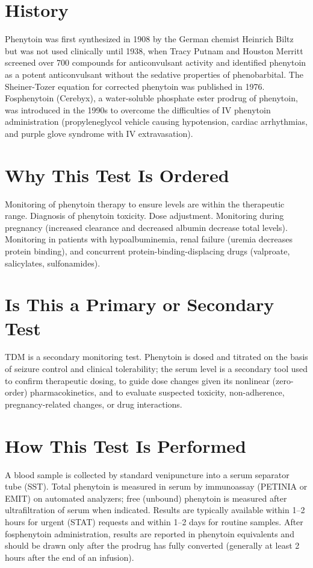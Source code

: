 \section*{History}
Phenytoin was first synthesized in 1908 by the German chemist Heinrich Biltz but was not used clinically until 1938, when Tracy Putnam and Houston Merritt screened over 700 compounds for anticonvulsant activity and identified phenytoin as a potent anticonvulsant without the sedative properties of phenobarbital. The Sheiner-Tozer equation for corrected phenytoin was published in 1976. Fosphenytoin (Cerebyx), a water-soluble phosphate ester prodrug of phenytoin, was introduced in the 1990s to overcome the difficulties of IV phenytoin administration (propyleneglycol vehicle causing hypotension, cardiac arrhythmias, and purple glove syndrome with IV extravasation).

\section*{Why This Test Is Ordered}
Monitoring of phenytoin therapy to ensure levels are within the therapeutic range. Diagnosis of phenytoin toxicity. Dose adjustment. Monitoring during pregnancy (increased clearance and decreased albumin decrease total levels). Monitoring in patients with hypoalbuminemia, renal failure (uremia decreases protein binding), and concurrent protein-binding-displacing drugs (valproate, salicylates, sulfonamides).

\section*{Is This a Primary or Secondary Test}
TDM is a secondary monitoring test. Phenytoin is dosed and titrated on the basis of seizure control and clinical tolerability; the serum level is a secondary tool used to confirm therapeutic dosing, to guide dose changes given its nonlinear (zero-order) pharmacokinetics, and to evaluate suspected toxicity, non-adherence, pregnancy-related changes, or drug interactions.

\section*{How This Test Is Performed}
A blood sample is collected by standard venipuncture into a serum separator tube (SST). Total phenytoin is measured in serum by immunoassay (PETINIA or EMIT) on automated analyzers; free (unbound) phenytoin is measured after ultrafiltration of serum when indicated. Results are typically available within 1--2 hours for urgent (STAT) requests and within 1--2 days for routine samples. After fosphenytoin administration, results are reported in phenytoin equivalents and should be drawn only after the prodrug has fully converted (generally at least 2 hours after the end of an infusion).

